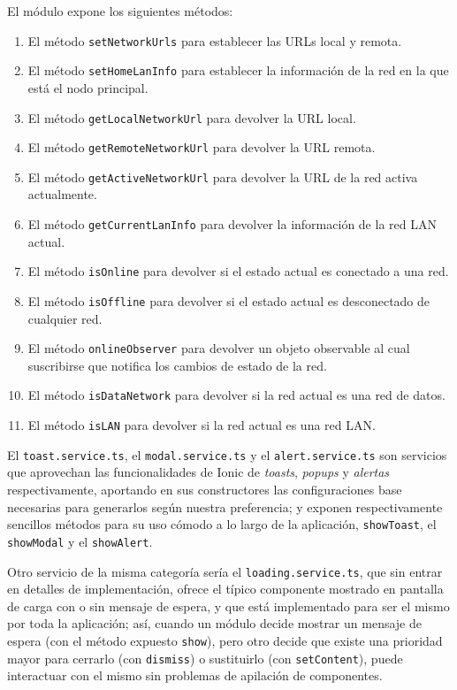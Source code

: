 El módulo expone los siguientes métodos:
\begin{enumerate}
    \item El método \verb|setNetworkUrls| para establecer las URLs local y remota.
    \item El método \verb|setHomeLanInfo| para establecer la información de la red en la que está el nodo principal.
    \item El método \verb|getLocalNetworkUrl| para devolver la URL local.
    \item El método \verb|getRemoteNetworkUrl| para devolver la URL remota.
    \item El método \verb|getActiveNetworkUrl| para devolver la URL de la red activa actualmente.
    \item El método \verb|getCurrentLanInfo| para devolver la información de la red LAN actual.
    \item El método \verb|isOnline| para devolver si el estado actual es conectado a una red.
    \item El método \verb|isOffline| para devolver si el estado actual es desconectado de cualquier red.
    \item El método \verb|onlineObserver| para devolver un objeto observable al cual suscribirse que notifica los cambios de estado de la red.
    \item El método \verb|isDataNetwork| para devolver si la red actual es una red de datos.
    \item El método \verb|isLAN| para devolver si la red actual es una red LAN.
\end{enumerate}

\vspace{1cm}

El \verb|toast.service.ts|, el \verb|modal.service.ts| y el \verb|alert.service.ts| son servicios que aprovechan las funcionalidades de Ionic de \textit{toasts}, \textit{popups} y \textit{alertas} respectivamente, aportando en sus constructores las configuraciones base necesarias para generarlos según nuestra preferencia; y exponen respectivamente sencillos métodos para su uso cómodo a lo largo de la aplicación, \verb|showToast|, el \verb|showModal| y el \verb|showAlert|.

\vspace{0.5cm}

Otro servicio de la misma categoría sería el \verb|loading.service.ts|, que sin entrar en detalles de implementación, ofrece el típico componente mostrado en pantalla de carga con o sin mensaje de espera, y que está implementado para ser el mismo por toda la aplicación; así, cuando un módulo decide mostrar un mensaje de espera (con el método expuesto \verb|show|), pero otro decide que existe una prioridad mayor para cerrarlo (con \verb|dismiss|) o sustituirlo (con \verb|setContent|), puede interactuar con el mismo sin problemas de apilación de componentes.

